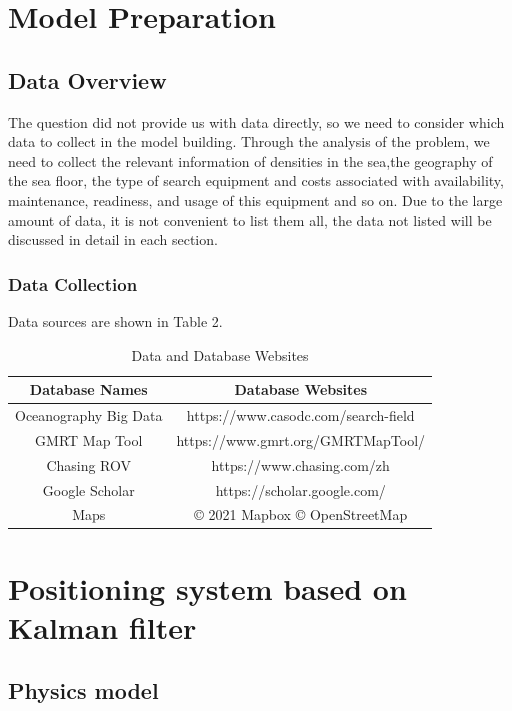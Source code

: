 \documentclass[12pt]{article}  %
\begin{document}
\section{Model Preparation}
\subsection{Data Overview}
The question did not provide us with data directly, so we need to consider which data to collect in the model building. 
Through the analysis of the problem, we need to collect the relevant information of
densities in the sea,the geography of the
sea floor, the type of search
equipment and costs associated with availability, maintenance,
readiness, and usage of this equipment and so on. 
Due to the large amount of data, it is not convenient to list them all, the data not listed will be discussed in detail in each section.

\subsubsection{Data Collection}
Data sources are shown in Table 2.

\begin{table}[htbp]
\begin{center}
\caption{Data and Database Websites}
\resizebox{\textwidth}{!}
{\begin{tabular}{c c}
\toprule[2pt]
\multicolumn{1}{m{5cm}}{\centering \textbf{Database Names}}
&\multicolumn{1}{m{10cm}}{\centering \textbf{Database Websites} }\\ %
\midrule
Oceanography Big Data& https://www.casodc.com/search-field \\
GMRT Map Tool & https://www.gmrt.org/GMRTMapTool/ \\
Chasing ROV & https://www.chasing.com/zh\\ 
Google Scholar & https://scholar.google.com/ \\
Maps& \copyright{} 2021 Mapbox \copyright{} OpenStreetMap\\
\bottomrule[2pt]
\end{tabular}}
\end{center}
\end{table}

\section{Positioning system based on Kalman filter}%
\subsection{Physics model}
\end{document}
